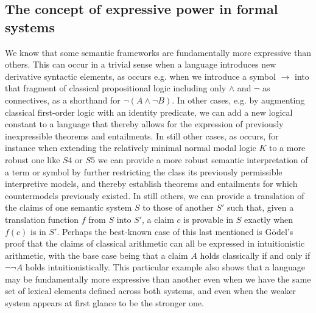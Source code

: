 \documentclass[]{article}
\begin{document}
\subsection{The concept of expressive power in formal systems}
We know that some semantic frameworks are fundamentally more expressive than others. 
This can occur in a trivial sense when a language introduces new derivative syntactic elements, 
as occurs e.g. when we introduce a symbol $\rightarrow$ into that fragment of classical propositional logic including only $\wedge $ and $\neg$ as connectives, 
as a shorthand for $\neg(A \wedge \neg B)$. 
In other cases, e.g. by augmenting classical first-order logic with an identity predicate, 
we can add a new logical constant to a language that thereby allows for the expression of previously inexpressible theorems and entailments. 
In still other cases, 
as occurs, for instance when extending the relatively minimal normal modal logic $K$ to a more robust one like $S4$ or $S5$
we can provide a more robust semantic interpretation of a term or symbol by further restricting the class its previously permissible interpretive models, 
and thereby establish theorems and entailments for which countermodels previously existed.
In still others, we can provide a translation of the claims of one semantic system $S$ to those of another $S'$ 
such that, 
given a translation function $f$ from $S$ into $S'$, 
a claim $c$ is provable in $S$ exactly when  $f(c)$ is in $S'$.
Perhaps the best-known case of this last mentioned is G\"{o}del's proof that the claims of classical arithmetic can all be expressed in intuitionistic arithmetic, 
with the base case being that a claim $A$ holds classically if and only if $\neg\neg A$ holds intuitionistically. 
This particular example also shows that a language may be fundamentally more expressive than another even when we have the same set of lexical elements defined across both systems, 
and even when the weaker system appears at first glance to be the stronger one. 
\end{document}
